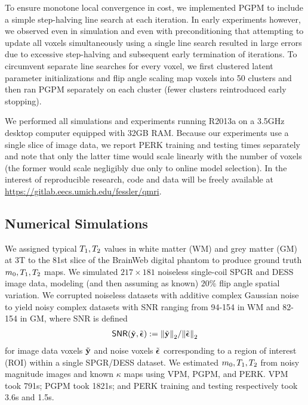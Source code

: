 To ensure monotone local convergence in cost,
we implemented PGPM to include 
a simple step-halving line search at each iteration.
In early experiments however,
we observed even in simulation 
and even with preconditioning
that attempting to update all voxels simultaneously 
using a single line search 
resulted in large errors
due to excessive step-halving 
and subsequent early termination of iterations. 
To circumvent separate line searches for every voxel,
we first clustered latent parameter initializations
and flip angle scaling map voxels into 50 clusters
and then ran PGPM separately on each cluster
(fewer clusters reintroduced early stopping).

We performed all simulations and experiments
running \matlab R2013a
on a 3.5GHz desktop computer
equipped with 32GB RAM. 
Because our experiments use a single slice of image data,
we report PERK training and testing times separately 
and note that only the latter time 
would scale linearly with the number of voxels
(the former would scale negligibly 
due only to online model selection).
In the interest of reproducible research,
code and data will be freely available
at \url{https://gitlab.eecs.umich.edu/fessler/qmri}.

\subsection{Numerical Simulations}
\label{ss,perk,exp,sim}

We assigned typical $T_1,T_2$ values 
in white matter (WM) and grey matter (GM) at 3T
\cite{wansapura:99:nrt}
to the 81st slice 
of the BrainWeb digital phantom
\cite{collins:98:dac}
to produce ground truth $m_0,T_1,T_2$ maps.
We simulated $217 \times 181$
noiseless single-coil SPGR and DESS image data,
modeling (and then assuming as known)
$20\%$ flip angle spatial variation.
We corrupted noiseless datasets
with additive complex Gaussian noise
to yield noisy complex datasets 
with SNR ranging from 94-154 in WM and 82-154 in GM,
where SNR is defined
\begin{align}
	\snr{\bmyt,\bmepst} := \norm{\bmyt}_2/\norm{\bmepst}_2
	\label{eq,snr}
\end{align}
for image data voxels $\tilde{\mathbf{y}}$ and noise voxels $\tilde{\boldsymbol{\epsilon}}$
corresponding to a region of interest (ROI)
within a single SPGR/DESS dataset.
We estimated $m_0,T_1,T_2$ 
from noisy magnitude images and known $\kappa$ maps
using VPM, PGPM, and PERK.
VPM took 791s;
PGPM took 1821s;
and 
PERK training and testing respectively took 3.6s and 1.5s.

